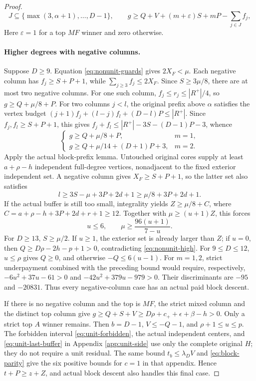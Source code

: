 \documentclass[11pt,a4paper]{article}
\theoremstyle{definition}
\begin{document}
\begin{proof}
\begin{equation}\label{eq:nonunit-negative}
 J\subseteq\{\max(3,\alpha+1),\ldots,D-1\},\qquad
 g\ge Q+V+(m+\varepsilon)S+mP-\sum_{j\in J}f_j,
\end{equation}
Here $\varepsilon=1$ for a top $MF$ winner and zero otherwise.

\paragraph{Higher degrees with negative columns.}
Suppose $D\ge9$.
Equation \eqref{eq:nonunit-guards} gives $2X_F<\mu$.
Each negative column has $f_j\ge S+P+1$, while $\sum_{j\ge3}f_j\le2X_F$.
Since $S\ge3\mu/8$, there are at most two negative columns.
For one such column, $f_j\le r_j\le|R^+|/4$, so $g\ge Q+\mu/8+P$.
For two columns $j<l$, the original prefix above $\alpha$ satisfies the vertex budget
$(j+1)f_j+(l-j)f_l+(D-l)P\le|R^+|$.
Since $f_j,f_l\ge S+P+1$, this gives
$f_j+f_l\le|R^+|-3S-(D-1)P-3$, whence
\begin{equation}\label{eq:nonunit-high}
 \begin{cases}
 g\ge Q+\mu/8+P,&m=1,\\
 g\ge Q+\mu/14+(D+1)P+3,&m=2.
 \end{cases}
\end{equation}
Apply the actual block-prefix lemma.
Untouched original cores supply at least $a+\rho-h$ independent full-degree vertices, nonadjacent to the fixed exterior independent set.
A negative column gives $X_F\ge S+P+1$, so the latter set also satisfies
\[
l\ge3S-\mu+3P+2d+1\ge\mu/8+3P+2d+1.
\]
If the actual buffer is still too small, integrality yields
$Z\ge\mu/8+C$, where $C=a+\rho-h+3P+2d+r+1\ge12$.
Together with $\mu\ge(u+1)Z$, this forces
\[
u\le6,\qquad \mu\ge\frac{96(u+1)}{7-u}.
\]
For $D\ge13$, $S\ge\mu/2$. If $u\ge1$, the exterior set is already larger than $Z$; if $u=0$, then $Q\ge D\rho-2h-p+1>0$, contradicting \eqref{eq:nonunit-high}.
For $9\le D\le12$, $u\le\rho$ gives $Q\ge0$, and otherwise $-Q\le6(u-1)$.
For $m=1,2$, strict underpayment combined with the preceding bound would require, respectively,
$-6u^2+37u-61>0$ and $-42u^2+379u-979>0$.
Their discriminants are $-95$ and $-20831$.
Thus every negative-column case has an actual paid block descent.

If there is no negative column and the top is $MF$, the strict mixed column and the distinct top column give
$g\ge Q+S+V\ge D\rho+c_++\epsilon+\beta-h>0$.
Only a strict top $A$ winner remains. Then $b=D-1$, $V\le-Q-1$, and $\rho+1\le u\le p$.
The forbidden interval \eqref{eq:unit-forbidden}, the actual independent centers, and \eqref{eq:unit-last-buffer} in Appendix \ref{app:unit-side} use only the complete original $H$; they do not require a unit residual.
The same bound $t_b\le\lambda_DV$ and \eqref{eq:block-parity} give the six positive bounds for $c=1$ in that appendix.
Hence $t+P\ge z+Z$, and actual block descent also handles this final case.


\end{proof}
\end{document}
